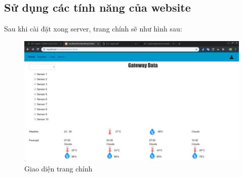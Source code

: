 \documentclass[a4paper]{article}
\begin{document}
    \subsection{Sử dụng các tính năng của website}
    Sau khi cài đặt xong server, trang chính sẽ như hình sau:
    \begin{figure}[htp]
        \centering
        \includegraphics[scale=0.3]{mainpage.png}
        \caption{Giao diện trang chính}
        \label{fig:my_label}
    \end{figure}
    
\end{document}
